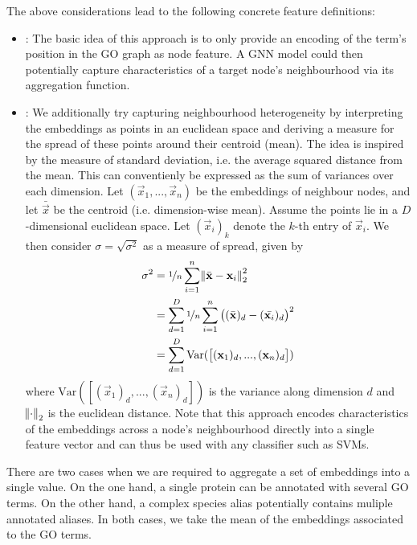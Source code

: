 \documentclass[
	fontsize=10pt, %
	twoside=true, %
	secnumdepth=1, %
  toc=indentunnumbered %
]{kaobook}
\begin{document}
The above considerations lead to the following concrete feature definitions:
\begin{itemize}
\item {}: The basic idea of this approach is to only provide an
  encoding of the term's position in the GO graph as node feature. A GNN model
  could then potentially capture characteristics of a target node's
  neighbourhood via its aggregation function.
\item {}: We additionally try capturing neighbourhood
  heterogeneity by interpreting the embeddings as points in an euclidean space
  and deriving a measure for the spread of these points around their centroid
  (mean). The idea is inspired by the measure of standard deviation, i.e. the
  average squared distance from the mean. This can conventienly be expressed as
  the sum of variances over each dimension. Let $(\vec x_1, ..., \vec x_n)$ be
  the embeddings of neighbour nodes, and let $\bar{\vec x}$ be the centroid
  (i.e. dimension-wise mean). Assume the points lie in a $D$-dimensional
  euclidean space. Let $(\vec x_i)_k$ denote the $k$-th entry of $\vec x_i$. We
  then consider $\sigma = \sqrt{\sigma^2}$ as a measure of spread, given by
  \begin{align*}
    \sigma^2 &= \nicefrac{1}{n} \sum_{i=1}^n \norm{\bar{\mathbf{x}} - \mathbf{x}_i}_2^2 \\
             &= \sum_{d=1}^D \nicefrac{1}{n} \sum_{i=1}^n
               \left( (\bar{\mathbf{x}})_d - (\bar{\mathbf{x}_i})_d\right)^2 \\
             &= \sum_{d=1}^D \text{Var}(\left[
               (\mathbf{x}_1)_d, ..., (\mathbf{x}_n)_d
               \right])
  \end{align*}
  where $\text{Var}(\left[(\vec x_1)_d, ..., (\vec x_n)_d \right])$ is the
  variance along dimension $d$ and $\norm{\cdot}_2$ is the euclidean distance.
  Note that this approach encodes characteristics of the embeddings across a
  node's neighbourhood directly into a single feature vector and can thus be
  used with any classifier such as SVMs.
\end{itemize}
There are two cases when we are required to
aggregate a set of embeddings into a single value. On the one hand, a single
protein can be annotated with several GO terms. On the other hand, a complex
species alias potentially contains muliple annotated aliases. In both cases,
we take the mean of the embeddings associated to the GO terms.
\end{document}

